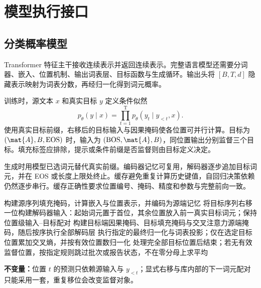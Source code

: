 \documentclass[../textbook.tex]{subfiles}
\begin{document}
\section{模型执行接口}

\subsection{分类概率模型}
Transformer 特征主干接收连续表示并返回连续表示。完整语言模型还需要分词器、嵌入、位置机制、输出词表层、目标函数与生成循环。输出头将 $[B,T,d]$ 隐藏表示映射为词表分数，再经归一化得到词元概率。

训练时，源文本 $x$ 和真实目标 $y$ 定义条件似然
\begin{equation}
 p_\theta(y\mid x)=\prod_{t=1}^{\mathrm{T}}p_\theta(y_t\mid y_{<t},x).
\end{equation}
使用真实目标前缀，右移后的目标输入与因果掩码使各位置可并行计算。目标为 $(\mat{A},B,\mathrm{EOS})$ 时，输入为 $(\mathrm{BOS},\mat{A},B)$，同位置输出分别监督三个目标。填充标签应排除，提示或条件前缀是否监督则由目标定义决定。

生成时用模型已选词元替代真实前缀。编码器记忆可复用，解码器逐步追加目标词元，并在 EOS 或长度上限处终止。缓存避免重复计算历史键值，自回归决策依赖仍然逐步串行。缓存正确性要求位置编号、掩码、精度和参数与完整前向一致。

\begin{algorithm}[教师强制的训练前向]
\begin{myalgorithmic}[1]
\State 构建源序列填充掩码，计算嵌入与位置表示，并编码为源端记忆
\State 将目标序列右移一位构建解码器输入：起始词元置于首位，其余位置放入前一真实目标词元；保持位置级输入--目标配对
\State 构建目标端因果掩码、目标填充掩码与交叉注意力源端掩码，随后按序执行全部解码层
\State 执行指定的最终归一化与词表投影；仅在选定目标位置累加交叉熵，并按有效位置数归一化
\State 处理完全部目标位置后结束；若无有效监督位置，按指定规则跳过批次或报告状态，不在零分母上求平均
\end{myalgorithmic}
\textbf{不变量：}位置 $t$ 的预测只依赖源输入与 $y_{<t}$；显式右移与库内部的下一词元配对只能采用一套，重复移位会改变监督对象。
\end{algorithm}
\end{document}

